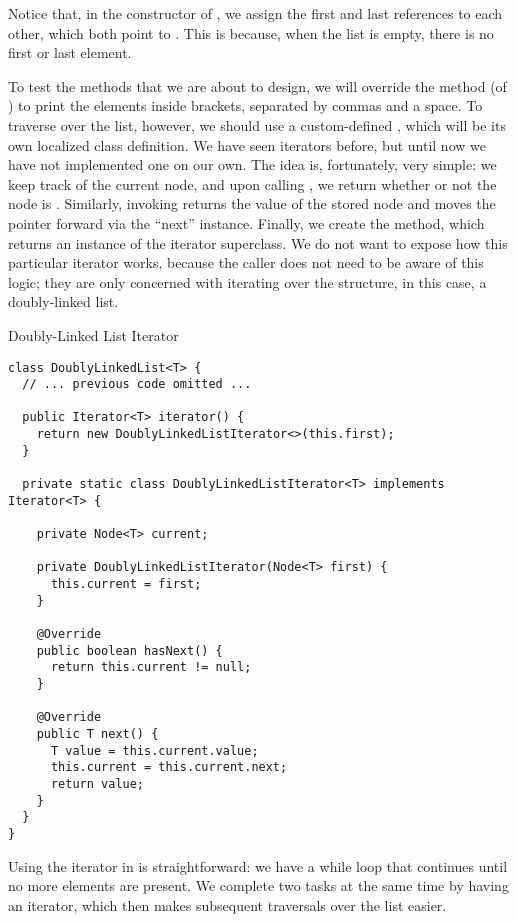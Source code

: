 Notice that, in the constructor of , we assign the first and last references to each other, which both point to . This is because, when the list is empty, there is no first or last element.

To test the methods that we are about to design, we will override the  method (of ) to print the elements inside brackets, separated by commas and a space. To traverse over the list, however, we should use a custom-defined , which will be its own localized class definition. We have seen iterators before, but until now we have not implemented one on our own. The idea is, fortunately, very simple: we keep track of the current node, and upon calling , we return whether or not the node is . Similarly, invoking  returns the value of the stored node and moves the pointer forward via the ``next'' instance. Finally, we create the  method, which returns an instance of the iterator superclass. We do not want to expose how this particular iterator works, because the caller does not need to be aware of this logic; they are only concerned with iterating over the structure, in this case, a doubly-linked list.

\begin{cl}{Doubly-Linked List Iterator}
\begin{lstlisting}[language=MyJava]
class DoublyLinkedList<T> {
  // ... previous code omitted ...

  public Iterator<T> iterator() {
    return new DoublyLinkedListIterator<>(this.first);
  }

  private static class DoublyLinkedListIterator<T> implements Iterator<T> {
    
    private Node<T> current;

    private DoublyLinkedListIterator(Node<T> first) {
      this.current = first;
    }

    @Override
    public boolean hasNext() { 
      return this.current != null; 
    }

    @Override
    public T next() {
      T value = this.current.value;
      this.current = this.current.next;
      return value;
    }
  }
}
\end{lstlisting}
\end{cl}

Using the iterator in  is straightforward: we have a while loop that continues until no more elements are present. We complete two tasks at the same time by having an iterator, which then makes subsequent traversals over the list easier.

